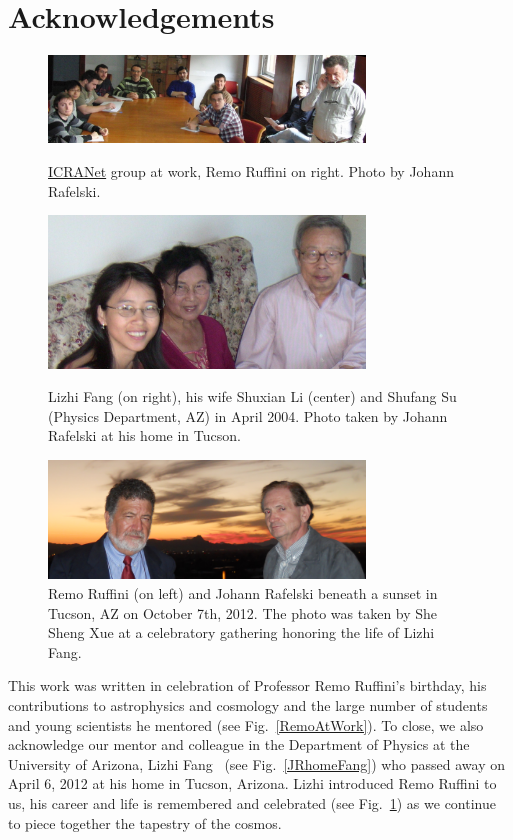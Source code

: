 \documentclass[universe,article,submit,moreauthors,pdftex,a4paper]{Definitions/mdpi}
\newcommand*{\rf}[1]{Fig.~{\ref{#1}}}
\newcommand*{\xblue}{\color{blue}}
\begin{document}
{\xblue 
\section*{Acknowledgements}

\begin{figure}[ht]
    \centering
    \includegraphics[width=0.75\textwidth]{./plots/12MarchRemoAtWorkC.jpg}
    \caption{\noindent\href{https://www.icranet.org/}{ICRANet} group at work, Remo Ruffini on right. Photo by Johann Rafelski.\label{RemoAtWork}}
    \vspace{\floatsep}
    \includegraphics[width=0.75\textwidth]{./plots/04April14ShuFangC.JPG}
    \caption{Lizhi Fang (on right), his wife Shuxian Li (center) and Shufang Su (Physics Department, AZ) in April 2004. Photo taken by Johann Rafelski at his home in Tucson.\label{JRhomeFang}}
    \vspace{\floatsep}
    \includegraphics[width=0.75\textwidth]{./plots/remo_sunset_new.PNG}
    \caption{Remo Ruffini (on left) and Johann Rafelski beneath a sunset in Tucson, AZ on October 7th, 2012. The photo was taken by She Sheng Xue at a celebratory gathering honoring the life of Lizhi Fang.\label{remo_sunset}}
\end{figure}

This work was written in celebration of Professor Remo Ruffini's birthday, his contributions to astrophysics and cosmology and the large number of students and young scientists he mentored (see \rf{RemoAtWork}). To close, we also acknowledge our mentor and colleague in the Department of Physics at the University of Arizona, Lizhi Fang~\cite{fang1984cosmology,fang1985galaxies,fang1987quantum} (see \rf{JRhomeFang}) who passed away on April 6, 2012 at his home in Tucson, Arizona. Lizhi introduced Remo Ruffini to us, his career and life is remembered and celebrated (see \rf{remo_sunset}) as we continue to piece together the tapestry of the cosmos.
}
\vfill\eject

\end{document}
